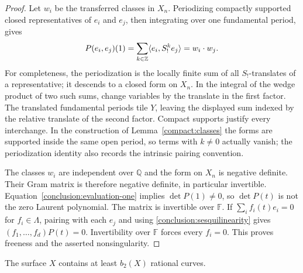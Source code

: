 \begin{proof}
Let $w_i$ be the transferred classes in $X_n$. Periodizing compactly
supported closed representatives of $e_i$ and $e_j$, then integrating
over one fundamental period, gives
\begin{equation}\label{conclusion:evaluation-one}
 P(e_i,e_j)(1)
 =\sum_{k\in\mathbb Z}\langle e_i,S_!^k e_j\rangle
 =w_i\cdot w_j.
\end{equation}
For completeness, the periodization is the locally finite sum of all
$S_!$-translates of a representative; it descends to a closed form on
$X_n$. In the integral of the wedge product of two such sums, change
variables by the translate in the first factor. The translated
fundamental periods tile $Y$, leaving the displayed sum indexed by the
relative translate of the second factor. Compact supports justify
every interchange. In the construction of Lemma~\ref{compact:classes}
the forms are supported inside the same open period, so terms with
$k\neq0$ actually vanish; the periodization identity also records the
intrinsic pairing convention.

The classes $w_i$ are independent over $\mathbb Q$ and the form on
$X_n$ is negative definite. Their Gram matrix is therefore negative
definite, in particular invertible. Equation~\eqref{conclusion:evaluation-one}
implies $\det P(1)\neq0$, so $\det P(t)$ is not the zero Laurent
polynomial. The matrix is invertible over $\mathbb F$.
If $\sum_i f_i(t)e_i=0$ for $f_i\in\Lambda$, pairing with each $e_j$
and using \eqref{conclusion:sesquilinearity} gives
$(f_1,\ldots,f_d)P(t)=0$. Invertibility over $\mathbb F$ forces every
$f_i=0$. This proves freeness and the asserted nonsingularity.
\end{proof}

\begin{proposition}
\label{conclusion:curves}
The surface $X$ contains at least $b_2(X)$ rational curves.
\end{proposition}

